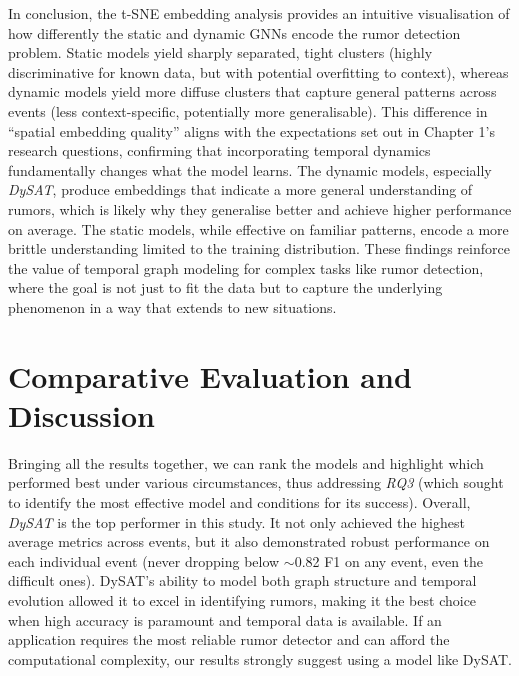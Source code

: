 \documentclass{cshonours}
\begin{document}
In conclusion, the t-SNE embedding analysis provides an intuitive visualisation of how differently the static and dynamic GNNs encode the rumor detection problem. Static models yield sharply separated, tight clusters (highly discriminative for known data, but with potential overfitting to context), whereas dynamic models yield more diffuse clusters that capture general patterns across events (less context-specific, potentially more generalisable). This difference in ``spatial embedding quality'' aligns with the expectations set out in Chapter 1's research questions, confirming that incorporating temporal dynamics fundamentally changes what the model learns. The dynamic models, especially \emph{DySAT}, produce embeddings that indicate a more general understanding of rumors, which is likely why they generalise better and achieve higher performance on average. The static models, while effective on familiar patterns, encode a more brittle understanding limited to the training distribution. These findings reinforce the value of temporal graph modeling for complex tasks like rumor detection, where the goal is not just to fit the data but to capture the underlying phenomenon in a way that extends to new situations.



\section{Comparative Evaluation and Discussion}



Bringing all the results together, we can rank the models and highlight which performed best under various circumstances, thus addressing \emph{RQ3} (which sought to identify the most effective model and conditions for its success). Overall, \emph{DySAT} is the top performer in this study. It not only achieved the highest average metrics across events, but it also demonstrated robust performance on each individual event (never dropping below $\sim$0.82 F1 on any event, even the difficult ones). DySAT's ability to model both graph structure and temporal evolution allowed it to excel in identifying rumors, making it the best choice when high accuracy is paramount and temporal data is available. If an application requires the most reliable rumor detector and can afford the computational complexity, our results strongly suggest using a model like DySAT.
\end{document}
